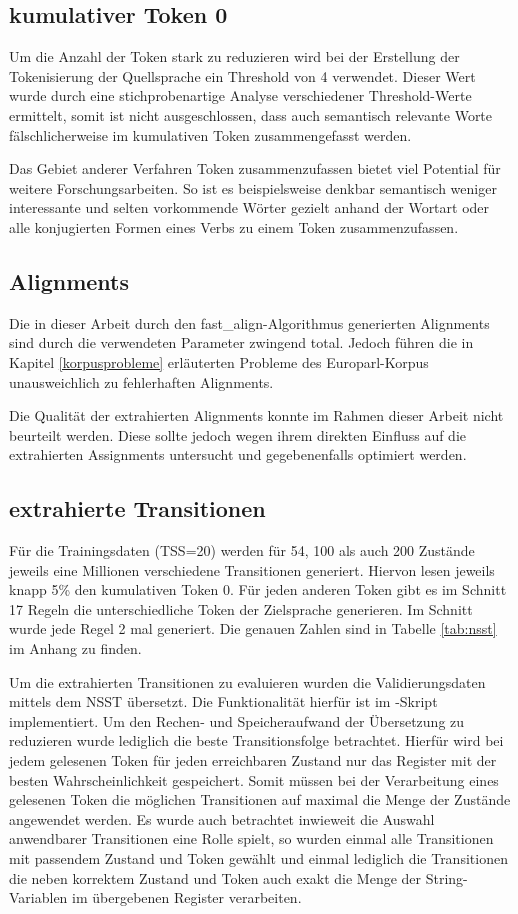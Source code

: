 \documentclass[conference]{IEEEtran}
\begin{document}
\subsection{kumulativer Token 0}
Um die Anzahl der Token stark zu reduzieren wird bei der Erstellung der Tokenisierung der Quellsprache ein Threshold von 4 verwendet.
Dieser Wert wurde durch eine stichprobenartige Analyse verschiedener Threshold-Werte ermittelt, somit ist nicht ausgeschlossen, dass auch semantisch relevante Worte fälschlicherweise im kumulativen Token zusammengefasst werden.

Das Gebiet anderer Verfahren Token zusammenzufassen bietet viel Potential für weitere Forschungsarbeiten. 
So ist es beispielsweise denkbar semantisch weniger interessante und selten vorkommende Wörter gezielt anhand der Wortart oder alle konjugierten Formen eines Verbs zu einem Token zusammenzufassen.

\subsection{Alignments}
Die in dieser Arbeit durch den fast\_align-Algorithmus generierten Alignments sind durch die verwendeten Parameter zwingend total.
Jedoch führen die in Kapitel \ref{korpusprobleme} erläuterten Probleme des Europarl-Korpus unausweichlich zu fehlerhaften Alignments.

Die Qualität der extrahierten Alignments konnte im Rahmen dieser Arbeit nicht beurteilt werden.
Diese sollte jedoch wegen ihrem direkten Einfluss auf die extrahierten Assignments untersucht und gegebenenfalls optimiert werden. 

\subsection{extrahierte Transitionen}
Für die Trainingsdaten (TSS=20) werden für 54, 100 als auch 200 Zustände jeweils eine Millionen verschiedene Transitionen generiert. 
Hiervon lesen jeweils knapp 5\% den kumulativen Token 0.
Für jeden anderen Token gibt es im Schnitt 17 Regeln die unterschiedliche Token der Zielsprache generieren.
Im Schnitt wurde jede Regel 2 mal generiert.
Die genauen Zahlen sind in Tabelle \ref{tab:nsst} im Anhang zu finden.

Um die extrahierten Transitionen zu evaluieren wurden die Validierungsdaten mittels dem NSST übersetzt.
Die Funktionalität hierfür ist im -Skript implementiert.
Um den Rechen- und Speicheraufwand der Übersetzung zu reduzieren wurde lediglich die beste Transitionsfolge betrachtet.
Hierfür wird bei jedem gelesenen Token für jeden erreichbaren Zustand nur das Register mit der besten Wahrscheinlichkeit gespeichert.
Somit müssen bei der Verarbeitung eines gelesenen Token die möglichen Transitionen auf maximal die Menge der Zustände angewendet werden.
Es wurde auch betrachtet inwieweit die Auswahl anwendbarer Transitionen eine Rolle spielt, so wurden einmal alle Transitionen mit passendem Zustand und Token gewählt und einmal lediglich die Transitionen die neben korrektem Zustand und Token auch exakt die Menge der String-Variablen im übergebenen Register verarbeiten.
\end{document}
